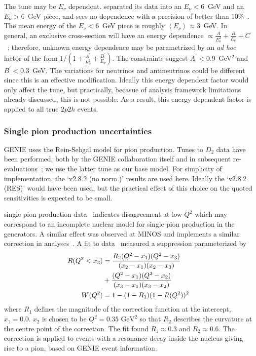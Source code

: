 The \minerva tune may be $E_\nu$ dependent. \minerva separated its data into an $E_\nu<6$~GeV and an $E_\nu>$6~GeV piece, and sees no dependence with a precision of better than $10\%$~\cite{Rodrigues:2015hik}.  The mean energy of the $E_\nu<6$~GeV piece is roughly $\left< E_\nu\right>\approx 3$~GeV.  In general, an exclusive cross-section will have an energy dependence $\propto \frac{A}{E_\nu^2}+\frac{B}{E_\nu}+C$~\cite{llewelyn-smith}; therefore, unknown energy dependence may be parametrized by an {\em ad hoc} factor of the form $1/\left(1+ \frac{A^{'}}{E_\nu^2 }+\frac{B^{'}}{E_\nu}\right)$.  The \minerva constraints suggest $A^{'}<0.9$~GeV$^2$ and $B^{'}<0.3$~GeV.  The variations for neutrinos and antineutrinos could be different since this is an effective modification. Ideally this energy dependent factor would only affect the \minerva tune, but practically, becasue of analysis framework limitations already discussed, this is not possible. As a result, this energy dependent factor is applied to all true $2p2h$ events.

\subsubsection{Single pion production uncertainties}
GENIE uses the Rein-Sehgal model for pion production. Tunes to $D_2$ data have been performed, both by the GENIE collaboration itself and in subsequent re-evaluations~\cite{Rodrigues:2016xjj}; we use the latter tune as our base model. For simplicity of implementation, the `v2.8.2 (no norm.)' results are used here. Ideally the `v2.8.2 (RES)' would have been used, but the practical effect of this choice on the quoted sensitivities is expected to be small.

\minerva single pion production data~\cite{Altinok:2017xua,McGivern:2016bwh,Eberly:2014mra} indicates disagreement at low $Q^2$ which may correspond to an incomplete nuclear model for single pion production in the generators. A similar effect was observed at MINOS\cite{minos_pi_q2} and \nova implements a similar correction in analyses~\cite{nova_2018}.
A fit to \minerva data~\cite{StowellThesis} measured a suppression parameterized by
\begin{align}
R(Q^2<x_3) & = \frac{R_{2} (Q^2-x_1)(Q^2-x_3)}{(x_2-x_1)(x_2-x_3)} \notag\\
             & + \frac{(Q^2-x_1)(Q^2-x_2)}{(x_3-x_1)(x_3-x_2)}  \\
W(Q^{2}) &= 1-(1-R_{1})(1-R(Q^{2}))^{2}
\end{align}
where $R_{1}$ defines the magnitude of the correction function at the intercept, $x_{1}=0.0$. $x_{2}$ is chosen to be $Q^2=0.35\text{ GeV}^2$ so that $R_{2}$ describes the curvature at the centre point of the correction. The fit found $R_1\approx0.3$ and $R_2\approx0.6$. The correction is applied to events with a resonance decay inside the nucleus giving rise to a pion, based on GENIE event information.

